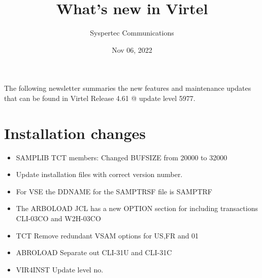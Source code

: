 \documentclass[letterpaper,10pt,english]{sphinxmanual}
\title{What's new in Virtel}
\date{Nov 06, 2022}
\author{Syspertec Communications}
\begin{document}
\pagestyle{empty}
\sphinxmaketitle
\pagestyle{plain}
\sphinxtableofcontents
\pagestyle{normal}
\label{\detokenize{TN202101::doc}}


The following newsletter summaries the new features and maintenance updates that can be found in Virtel Release 4.61 @ update level 5977.


\chapter{Installation changes}
\label{\detokenize{TN202101:installation-changes}}
\begin{itemize}
\item {} 
SAMPLIB TCT members: Changed BUFSIZE from 20000 to 32000

\end{itemize}

\begin{itemize}
\item {} 
Update installation files with correct version number.

\end{itemize}

\begin{itemize}
\item {} 
For VSE the DDNAME for the SAMPTRSF file is SAMPTRF

\end{itemize}

\begin{itemize}
\item {} 
The ARBOLOAD JCL has a new OPTION section for including transactions CLI-03CO and W2H-03CO

\end{itemize}

\begin{itemize}
\item {} 
TCT                           Remove redundant VSAM options for US,FR and 01

\item {} 
ABROLOAD                  Separate out CLI-31U and CLI-31C

\item {} 
VIR4INST                  Update level no.

\end{itemize}
\end{document}
